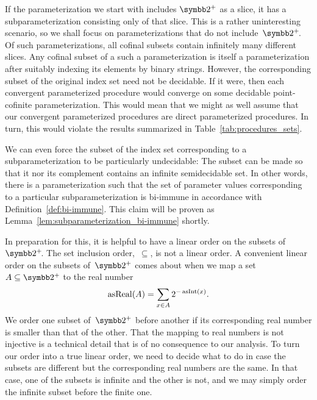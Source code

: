 If the parameterization we start with includes $\binary^+$ as a slice, it has a subparameterization consisting only of that slice.
This is a rather uninteresting scenario, so we shall focus on parameterizations that do not include~$\binary^+\!$.
Of such parameterizations, all cofinal subsets contain infinitely many different slices.
Any cofinal subset of a such a parameterization is itself a parameterization after suitably indexing its elements by binary strings.
However, the corresponding subset of the original index set need not be decidable.
If it were, then each convergent parameterized procedure would converge on some decidable point-cofinite parameterization.
This would mean that we might as well assume that our convergent parameterized procedures are direct parameterized procedures.
In turn, this would violate the results summarized in Table~\ref{tab:procedures_sets}.

We can even force the subset of the index set corresponding to a subparameterization to be particularly undecidable:
The subset can be made so that it nor its complement contains an infinite semidecidable set.
In other words, there is a parameterization such that the set of parameter values corresponding to a particular subparameterization is bi-immune in accordance with Definition~\ref{def:bi-immune}.
This claim will be proven as Lemma~\ref{lem:subparameterization_bi-immune} shortly.

In preparation for this, it is helpful to have a linear order on the subsets of~$\binary^+\!$.
The set inclusion order,~$\subseteq$, is not a linear order.
A convenient linear order on the subsets of~$\binary^+$ comes about when we map a set $A \subseteq \binary^+$ to the real number
\begin{equation*}
  \operatorname{asReal}(A) = \sum_{x \in A} 2^{-\operatorname{asInt}(x)}.
\end{equation*}
We order one subset of~$\binary^+$ before another if its corresponding real number is smaller than that of the other.
That the mapping to real numbers is not injective is a technical detail that is of no consequence to our analysis.
To turn our order into a true linear order, we need to decide what to do in case the subsets are different but the corresponding real numbers are the same.
In that case, one of the subsets is infinite and the other is not, and we may simply order the infinite subset before the finite one.

